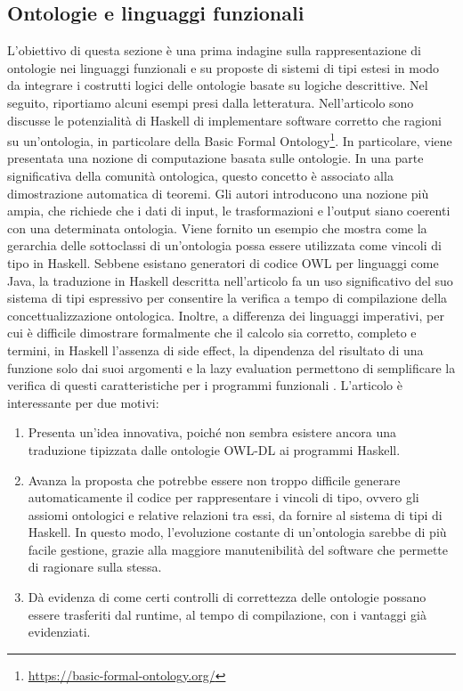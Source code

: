 \subsection{Ontologie e linguaggi funzionali}
L'obiettivo di questa sezione è una prima indagine sulla rappresentazione di ontologie nei linguaggi funzionali e su proposte di sistemi di tipi estesi in modo da integrare i costrutti logici delle ontologie basate su logiche descrittive. Nel seguito, riportiamo alcuni esempi presi dalla letteratura.
Nell'articolo \cite{verifiableontologybasedcomputation} sono discusse le potenzialità di Haskell di implementare software corretto che ragioni su un'ontologia, in particolare della Basic Formal Ontology\footnote{\url{https://basic-formal-ontology.org/}}. In particolare, viene presentata una nozione di computazione basata sulle ontologie. In una parte significativa della comunità ontologica, questo concetto è associato alla dimostrazione automatica di teoremi. Gli autori introducono una nozione più ampia, che richiede che i dati di input, le trasformazioni e l'output siano coerenti con una determinata ontologia. Viene fornito un esempio che mostra come la gerarchia delle sottoclassi di un'ontologia possa essere utilizzata come vincoli di tipo in Haskell. Sebbene esistano generatori di codice OWL per linguaggi come Java, la traduzione in Haskell descritta nell'articolo fa un uso significativo del suo sistema di tipi espressivo per consentire la verifica a tempo di compilazione della concettualizzazione ontologica. Inoltre, a differenza dei linguaggi imperativi, per cui è difficile dimostrare formalmente che il calcolo sia corretto, completo e termini, in Haskell l'assenza di side effect, la dipendenza del risultato di una funzione solo dai suoi argomenti e la lazy evaluation permettono di semplificare la verifica di questi caratteristiche per i programmi funzionali \cite{hugheswhyFPMatters}. L'articolo è interessante per due motivi:
\begin{enumerate}
	\item Presenta un'idea innovativa, poiché non sembra esistere ancora una traduzione tipizzata dalle ontologie OWL-DL ai programmi Haskell.
	\item Avanza la proposta che potrebbe essere non troppo difficile generare automaticamente il codice per rappresentare i vincoli di tipo, ovvero gli assiomi ontologici e relative relazioni tra essi, da fornire al sistema di tipi di Haskell. In questo modo, l'evoluzione costante di un'ontologia sarebbe di più facile gestione, grazie alla maggiore manutenibilità del software che permette di ragionare sulla stessa.
	\item Dà evidenza di come certi controlli di correttezza delle ontologie possano essere trasferiti dal runtime, al tempo di compilazione, con i vantaggi già evidenziati.
\end{enumerate}

